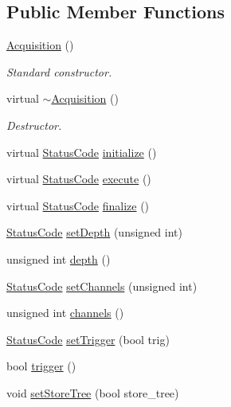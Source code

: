 \subsection*{Public Member Functions}
\begin{DoxyCompactItemize}
\item 
\hyperlink{classAcquisition_aa7d3138495a4a8888c21b33f4d657732}{Acquisition} ()
\begin{DoxyCompactList}\small\item\em Standard constructor. \item\end{DoxyCompactList}\item 
virtual \hyperlink{classAcquisition_a3b0205ba385e2da70abb5a351c4dbf0f}{$\sim$Acquisition} ()
\begin{DoxyCompactList}\small\item\em Destructor. \item\end{DoxyCompactList}\item 
virtual \hyperlink{classStatusCode}{StatusCode} \hyperlink{classAcquisition_acffc6b70b80811657409f92e489584ba}{initialize} ()
\item 
virtual \hyperlink{classStatusCode}{StatusCode} \hyperlink{classAcquisition_ae3b63064bee1b042914b63ae4135cbd8}{execute} ()
\item 
virtual \hyperlink{classStatusCode}{StatusCode} \hyperlink{classAcquisition_ab8ffcd86548280f0403b3ae6338f2499}{finalize} ()
\item 
\hyperlink{classStatusCode}{StatusCode} \hyperlink{classAcquisition_a303145d497f99da966fcfd95c00cd81e}{setDepth} (unsigned int)
\item 
unsigned int \hyperlink{classAcquisition_a1ad973e21a067c0de0b6264d0eb5182b}{depth} ()
\item 
\hyperlink{classStatusCode}{StatusCode} \hyperlink{classAcquisition_a3ee93f665573b4622bd9cba92c0cc04e}{setChannels} (unsigned int)
\item 
unsigned int \hyperlink{classAcquisition_a3041537afcb4dfe5c6940f0ef6829265}{channels} ()
\item 
\hyperlink{classStatusCode}{StatusCode} \hyperlink{classAcquisition_acdb167b43f3babb59a98698aa5c5066f}{setTrigger} (bool trig)
\item 
bool \hyperlink{classAcquisition_a6f680938eb6a42d57dfa7466e8852af9}{trigger} ()
\item 
void \hyperlink{classAcquisition_a759193856d26354722e5f647e60e16de}{setStoreTree} (bool store\_\-tree)

\end{DoxyCompactItemize}
